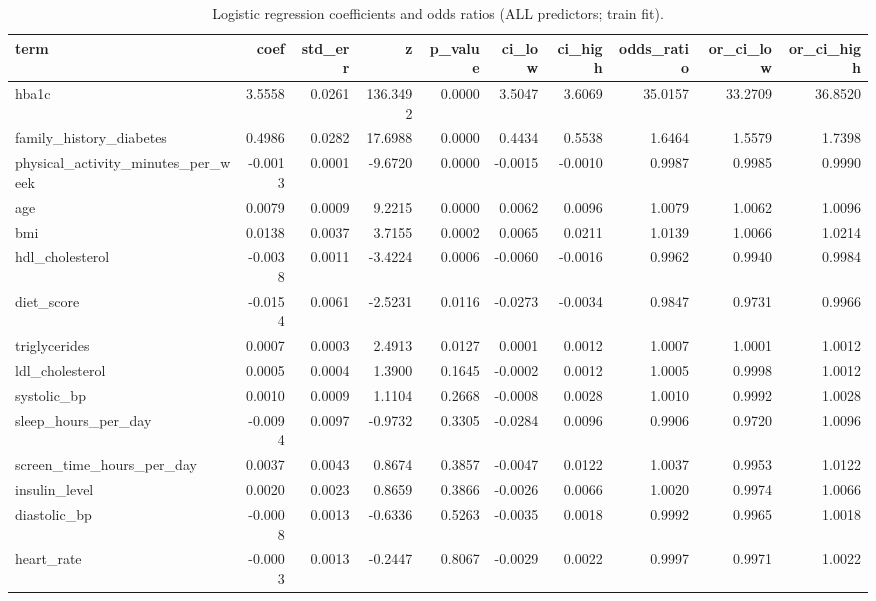 \begin{table}[H]
\begin{center}
\begin{tabular}{lrrrrrrrrr}
\toprule
term & coef & std_err & z & p_value & ci_low & ci_high & odds_ratio & or_ci_low & or_ci_high \\
\midrule
hba1c & 3.5558 & 0.0261 & 136.3492 & 0.0000 & 3.5047 & 3.6069 & 35.0157 & 33.2709 & 36.8520 \\
family\_history\_diabetes & 0.4986 & 0.0282 & 17.6988 & 0.0000 & 0.4434 & 0.5538 & 1.6464 & 1.5579 & 1.7398 \\
physical\_activity\_minutes\_per\_week & -0.0013 & 0.0001 & -9.6720 & 0.0000 & -0.0015 & -0.0010 & 0.9987 & 0.9985 & 0.9990 \\
age & 0.0079 & 0.0009 & 9.2215 & 0.0000 & 0.0062 & 0.0096 & 1.0079 & 1.0062 & 1.0096 \\
bmi & 0.0138 & 0.0037 & 3.7155 & 0.0002 & 0.0065 & 0.0211 & 1.0139 & 1.0066 & 1.0214 \\
hdl\_cholesterol & -0.0038 & 0.0011 & -3.4224 & 0.0006 & -0.0060 & -0.0016 & 0.9962 & 0.9940 & 0.9984 \\
diet\_score & -0.0154 & 0.0061 & -2.5231 & 0.0116 & -0.0273 & -0.0034 & 0.9847 & 0.9731 & 0.9966 \\
triglycerides & 0.0007 & 0.0003 & 2.4913 & 0.0127 & 0.0001 & 0.0012 & 1.0007 & 1.0001 & 1.0012 \\
ldl\_cholesterol & 0.0005 & 0.0004 & 1.3900 & 0.1645 & -0.0002 & 0.0012 & 1.0005 & 0.9998 & 1.0012 \\
systolic\_bp & 0.0010 & 0.0009 & 1.1104 & 0.2668 & -0.0008 & 0.0028 & 1.0010 & 0.9992 & 1.0028 \\
sleep\_hours\_per\_day & -0.0094 & 0.0097 & -0.9732 & 0.3305 & -0.0284 & 0.0096 & 0.9906 & 0.9720 & 1.0096 \\
screen\_time\_hours\_per\_day & 0.0037 & 0.0043 & 0.8674 & 0.3857 & -0.0047 & 0.0122 & 1.0037 & 0.9953 & 1.0122 \\
insulin\_level & 0.0020 & 0.0023 & 0.8659 & 0.3866 & -0.0026 & 0.0066 & 1.0020 & 0.9974 & 1.0066 \\
diastolic\_bp & -0.0008 & 0.0013 & -0.6336 & 0.5263 & -0.0035 & 0.0018 & 0.9992 & 0.9965 & 1.0018 \\
heart\_rate & -0.0003 & 0.0013 & -0.2447 & 0.8067 & -0.0029 & 0.0022 & 0.9997 & 0.9971 & 1.0022 \\
\bottomrule
\end{tabular}
\end{center}
\vspace{-5pt}
\caption{Logistic regression coefficients and odds ratios (ALL predictors; train fit).}
\label{tab:logit_coef_all}
\end{table}
